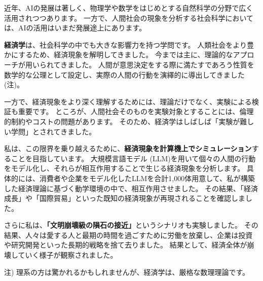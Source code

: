 近年、AIの発展は著しく、物理学や数学をはじめとする自然科学の分野で広く活用されつつあります。
一方で、人間社会の現象を分析する社会科学においては、AIの活用はいまだ発展途上にあります。

\textbf{経済学}は、社会科学の中でも大きな影響力を持つ学問です。
人類社会をより豊かにするため、経済現象を解明してきました。
今までは主に、理論的なアプローチが用いられてきました。
人間が意思決定をする際に満たすであろう性質を数学的な公理として設定し、実際の人間の行動を演繹的に導出してきました(注)。

一方で、経済現象をより深く理解するためには、理論だけでなく、実験による検証も重要です。
ところが、人間社会そのものを実験対象とすることには、倫理的制約やコストの問題があります。
そのため、経済学はしばしば「実験が難しい学問」とされてきました。

私は、この限界を乗り越えるために、\textbf{経済現象を計算機上でシミュレーション}することを目指しています。
大規模言語モデル (LLM)を用いて個々の人間の行動をモデル化し、それらが相互作用することで生じる経済現象を分析します。
具体的には、消費者や企業をモデル化したLLMを合計1,000体用意して、私が構築した経済理論に基づく動学環境の中で、相互作用させました。
その結果、「経済成長」や「国際貿易」といった既知の経済現象が再現されることを確認しました。

さらに私は、\textbf{「文明崩壊級の隕石の接近」}というシナリオも実験しました。
その結果、人々は愛する人と最期の時間を過ごすために労働を放棄し、企業は投資や研究開発といった長期的戦略を捨て去りました。
結果として、経済全体が崩壊していく様子が観察されました。

\vspace{\baselineskip}

\begin{flushright}
注) 理系の方は驚かれるかもしれませんが、経済学は、厳格な数理理論です。
\end{flushright}
